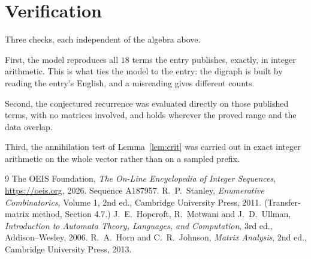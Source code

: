 \documentclass[11pt,a4paper]{article}
\theoremstyle{plain}
\theoremstyle{definition}
\begin{document}
\section{Verification}

Three checks, each independent of the algebra above.

First, the model reproduces all $18$ terms the entry publishes, exactly, in integer
arithmetic. This is what ties the model to the entry: the digraph is built by reading the
entry's English, and a misreading gives different counts.

Second, the conjectured recurrence was evaluated directly on those published terms, with no
matrices involved, and holds wherever the proved range and the data overlap.

Third, the annihilation test of Lemma~\ref{lem:crit} was carried out in exact integer
arithmetic on the whole vector rather than on a sampled prefix.

\begin{thebibliography}{9}
 The OEIS Foundation, \emph{The On-Line Encyclopedia of Integer
Sequences}, \url{https://oeis.org}, 2026. Sequence A187957.
 R.~P.~Stanley, \emph{Enumerative Combinatorics}, Volume 1, 2nd ed.,
Cambridge University Press, 2011. (Transfer-matrix method, Section 4.7.)
 J.~E.~Hopcroft, R.~Motwani and J.~D.~Ullman, \emph{Introduction to Automata
Theory, Languages, and Computation}, 3rd ed., Addison--Wesley, 2006.
 R.~A.~Horn and C.~R.~Johnson, \emph{Matrix Analysis}, 2nd ed., Cambridge
University Press, 2013.
\end{thebibliography}
\end{document}
